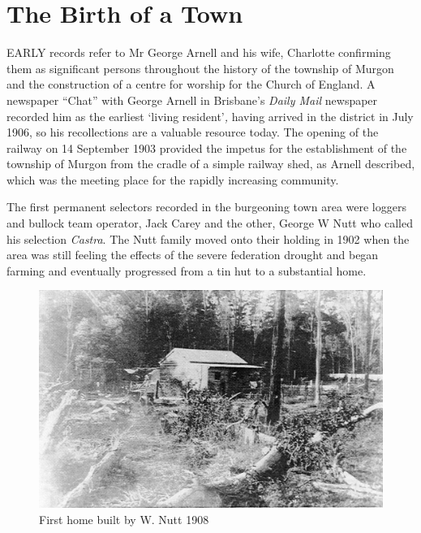 \balance


\printendnotes[custom]
\setcounter{endnote}{0}
\chapter{The Birth of a Town}
\nobalance


\lettrine[lines=3]{E}{ARLY}
 records refer to Mr George Arnell and his wife, Charlotte confirming them as significant persons throughout the history of the township of Murgon and the construction of a centre for worship for the Church of England. A newspaper ``Chat'' with George Arnell in Brisbane's \emph{Daily Mail} newspaper recorded him as the earliest `living resident'\emph{,} having arrived in the district in July 1906, so his recollections are a valuable resource today. The opening of the railway on 14 September 1903 provided the impetus for the establishment of the township of Murgon from the cradle of a simple railway shed, as Arnell described, which was the meeting place for the rapidly increasing community.

The first permanent selectors recorded in the burgeoning town area were loggers and bullock team operator, Jack Carey and the other, George W Nutt who called his selection \emph{Castra}. The Nutt family moved onto their holding in 1902 when the area was still feeling the effects of the severe federation drought and began farming and eventually progressed from a tin hut to a substantial home.









\begin{figure}
\begin{center}
\includegraphics[width=1.\linewidth,center]{../images/HouseWNutt1908.jpg}
\caption{First home built by W. Nutt 1908}
\end{center}
\end{figure}




